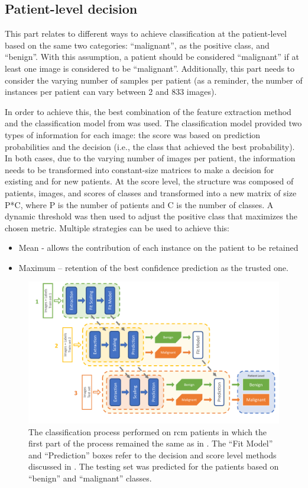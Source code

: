 \documentclass[journal,article,accept,moreauthors,pdftex, applsci]{Definitions/mdpi}
\providecommand{\DIFadd}[1]{{\protect\color{blue}\uwave{#1}}} %
\providecommand{\DIFaddbegin}{} %
\providecommand{\DIFaddend}{} %
\begin{document}
\subsection{Patient-level decision}
\label{sec:patient_decision}
This part relates to different ways to achieve classification at the patient-level based on the same two categories: “malignant”, as the positive class, and “benign”. With this assumption, a patient should be considered “malignant” if at least one image is considered to be “malignant”. Additionally, this part needs to consider the varying number of samples per patient (as a reminder, the number of instances per patient can vary between 2 and 833 images).\par
In order to achieve this, the best combination of the feature extraction method and the classification model from  was used. The classification model provided two types of information for each image: the score was based on prediction probabilities and the decision (i.e., the class that achieved the best probability). In both cases, due to the varying number of images per patient, the information needs to be transformed into constant-size matrices to make a decision for existing and for new patients. At the score level, the structure was composed of patients, images, and scores of classes and transformed into a new matrix of size P*C, where P is the number of patients and C is the number of classes. A dynamic threshold was then used to adjust the positive class that maximizes the chosen metric. Multiple strategies can be used to achieve this:
\begin{itemize}
\item Mean - allows the contribution of each instance on the patient to be retained
\item Maximum – retention of the best confidence prediction as \DIFaddbegin \DIFadd{to }\DIFaddend the trusted one.
\end{itemize}
\begin{figure}[H]
    \begin{center}
        \includegraphics[width=0.8\linewidth]{Figures/Process_Decision.pdf}
        \caption{The classification process performed on \ac{rcm} patients in which the first part of the process remained the same as in . The “Fit Model” and “Prediction” boxes refer to the decision and score level methods discussed in . The testing set was predicted for the patients based on “benign” and “malignant” classes.}
        \label{fig:decision_process}
    \end{center} 
\end{figure}\par
\end{document}
